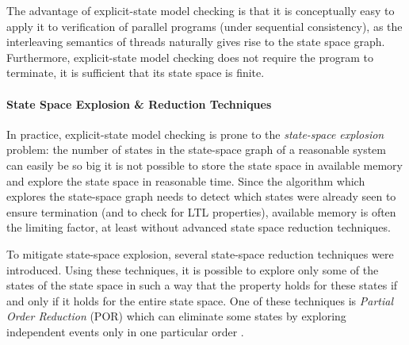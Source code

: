 The advantage of explicit-state model checking is that it is conceptually easy
to apply it to verification of parallel programs (under sequential
consistency), as the interleaving semantics of threads naturally gives rise to
the state space graph.
Furthermore, explicit-state model checking does not require the program to terminate, it is sufficient that its state space is finite.

\paragraph{State Space Explosion \& Reduction Techniques}

In practice, explicit-state model checking is prone to the \emph{state-space
explosion} problem: the number of states in the state-space graph of a
reasonable system can easily be so big it is not possible to store the state
space in available memory and explore the state space in reasonable time.
Since the algorithm which explores the state-space graph needs to detect which
states were already seen to ensure termination (and to check for LTL
properties), available memory is often the limiting factor, at least without
advanced state space reduction techniques.

To mitigate state-space explosion, several state-space reduction techniques
were introduced.
Using these techniques, it is possible to explore only some of the states of
the state space in such a way that the property holds for these states if and
only if it holds for the entire state space.
One of these techniques is \emph{Partial Order Reduction} (POR) which
can eliminate some states by exploring independent events only in one
particular order .

